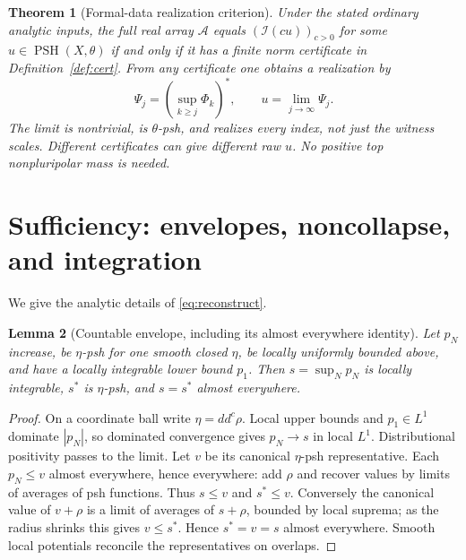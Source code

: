 \documentclass[11pt]{article}
\newcommand{\I}{\mathcal I}
\newcommand{\A}{\mathcal A}
\newcommand{\PSH}{\operatorname{PSH}}
\newtheorem{theorem}{Theorem}[section]
\newtheorem{lemma}[theorem]{Lemma}
\theoremstyle{definition}
\begin{document}
\begin{theorem}[Formal-data realization criterion]\label{thm:main}
Under the stated ordinary analytic inputs, the full real array
$\A$ equals $(\I(cu))_{c>0}$ for some $u\in\PSH(X,\theta)$
if and only if it has a finite norm certificate in
Definition~\ref{def:cert}. From any certificate one obtains a
realization by
\begin{equation}\label{eq:reconstruct}
 \Psi_j=\left(\sup_{k\geq j}\Phi_k\right)^*,
 \qquad u=\lim_{j\to\infty}\Psi_j.
\end{equation}
The limit is nontrivial, is $\theta$-psh, and realizes every index,
not just the witness scales. Different certificates can give
different raw $u$. No positive top nonpluripolar mass is needed.
\end{theorem}

\section{Sufficiency: envelopes, noncollapse, and integration}\label{sec:suff}
We give the analytic details of \eqref{eq:reconstruct}.
\begin{lemma}[Countable envelope, including its almost everywhere identity]
Let $p_N$ increase, be $\eta$-psh for one smooth closed $\eta$,
be locally uniformly bounded above, and have a locally integrable
lower bound $p_1$. Then $s=\sup_Np_N$ is locally integrable,
$s^*$ is $\eta$-psh, and $s=s^*$ almost everywhere.
\end{lemma}
\begin{proof}
On a coordinate ball write $\eta=dd^c\rho$. Local upper bounds
and $p_1\in L^1$ dominate $|p_N|$, so dominated convergence gives
$p_N\to s$ in local $L^1$. Distributional positivity passes to
the limit. Let $v$ be its canonical $\eta$-psh representative.
Each $p_N\leq v$ almost everywhere, hence everywhere: add $\rho$
and recover values by limits of averages of psh functions. Thus
$s\leq v$ and $s^*\leq v$. Conversely the canonical value of
$v+\rho$ is a limit of averages of $s+\rho$, bounded by local
suprema; as the radius shrinks this gives $v\leq s^*$. Hence
$s^*=v=s$ almost everywhere. Smooth local potentials reconcile
the representatives on overlaps.
\end{proof}
\end{document}
